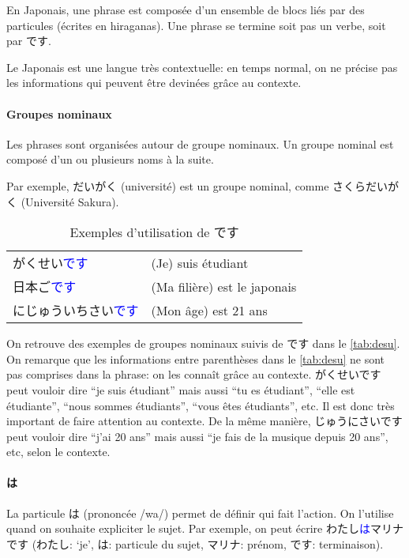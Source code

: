 \documentclass[a4paper,10pt,french,openany]{memoir}
\newcommand{\term}[1]{\textcolor{blue}{#1}}
\begin{document}
En Japonais, une phrase est composée d'un ensemble de blocs liés par des particules (écrites en hiraganas). Une phrase se termine soit pas un verbe, soit par です.

Le Japonais est une langue très contextuelle: en temps normal, on ne précise pas les informations qui peuvent être devinées grâce au contexte.

\paragraph{Groupes nominaux}
Les phrases sont organisées autour de groupe nominaux. Un groupe nominal est composé d'un ou plusieurs noms à la suite.

Par exemple, だいがく (université) est un groupe nominal, comme さくらだいがく (Université Sakura).

\begin{table}[htbp]
 \centering
 \caption{Exemples d'utilisation de です}
 \label{tab:desu}
 \begin{tabular}{ll}
  がくせい\term{です} & (Je) suis étudiant \\
  日本ご\term{です} & (Ma filière) est le japonais\\
  にじゅういちさい\term{です} & (Mon âge) est 21 ans\\
 \end{tabular}
\end{table}

On retrouve des exemples de groupes nominaux suivis de です dans le \autoref{tab:desu}.
On remarque que les informations entre parenthèses dans le \autoref{tab:desu} ne sont pas comprises dans la phrase: on les connaît grâce au contexte. がくせいです peut vouloir dire ``je suis étudiant'' mais aussi ``tu es étudiant'', ``elle est étudiante'', ``nous sommes étudiants'', ``vous êtes étudiants'', etc. Il est donc très important de faire attention au contexte.
De la même manière, じゅうにさいです peut vouloir dire ``j'ai 20 ans'' mais aussi ``je fais de la musique depuis 20 ans'', etc, selon le contexte.

\paragraph{は}
La particule は (prononcée /wa/) permet de définir qui fait l'action. On l'utilise quand on souhaite expliciter le sujet. Par exemple, on peut écrire わたし\term{は}マリナです (わたし: `je', は: particule du sujet, マリナ: prénom, です: terminaison).
\end{document}
